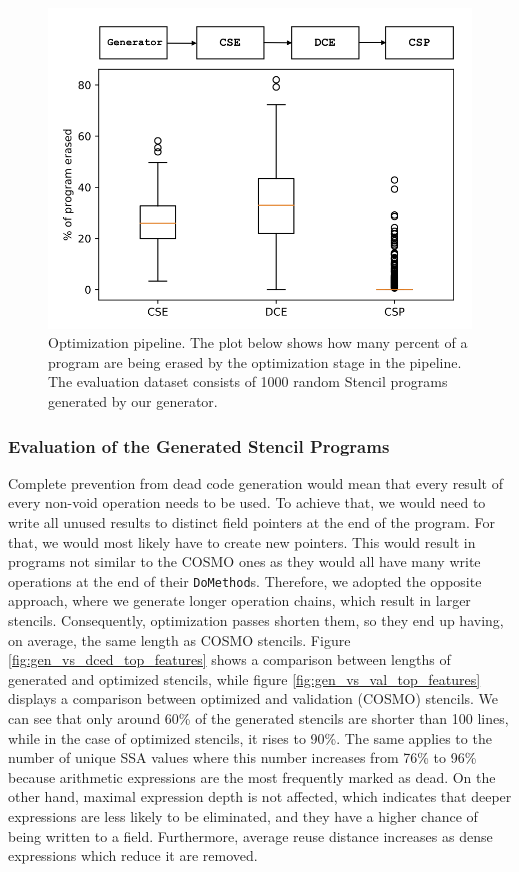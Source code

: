 \documentclass[sigplan,\review anonymous]{acmart}
\begin{document}
\begin{figure}[!htb]
  \centering
  \includegraphics[width=\columnwidth]{images/cse_dce_csp_comparison.png}
  \caption{Optimization pipeline. The plot below shows how many percent
  of a program are being erased by the optimization stage in the pipeline.
  The evaluation dataset consists of 1000 random Stencil programs generated
  by our generator.}
  \label{fig:cse_dce_csp_comparison}
\end{figure}

\subsubsection{Evaluation of the Generated Stencil Programs}

Complete prevention from dead code generation would mean that every result
of every non-void operation needs to be used. To achieve that, we would need
to write all unused results to distinct field pointers at the end of the
program. For that, we would most likely have to create new pointers. This
would result in programs not similar to the COSMO ones as they would all
have many write operations at the end of their \texttt{DoMethod}s. Therefore,
we adopted the opposite approach, where we generate longer operation chains,
which result in larger stencils. Consequently, optimization passes shorten
them, so they end up having, on average, the same length as COSMO stencils.
Figure \ref{fig:gen_vs_dced_top_features} shows a comparison between lengths
of generated and optimized stencils, while figure
\ref{fig:gen_vs_val_top_features} displays a comparison between optimized and
validation (COSMO) stencils. We can see that only around 60\% of the generated
stencils are shorter than 100 lines, while in the case of optimized stencils,
it rises to 90\%. The same applies to the number of unique SSA values where
this number increases from 76\% to 96\% because arithmetic expressions are
the most frequently marked as dead. On the other hand, maximal expression
depth is not affected, which indicates that deeper expressions are less
likely to be eliminated, and they have a higher chance of being written to
a field. Furthermore, average reuse distance increases as dense expressions
which reduce it are removed.
\end{document}
